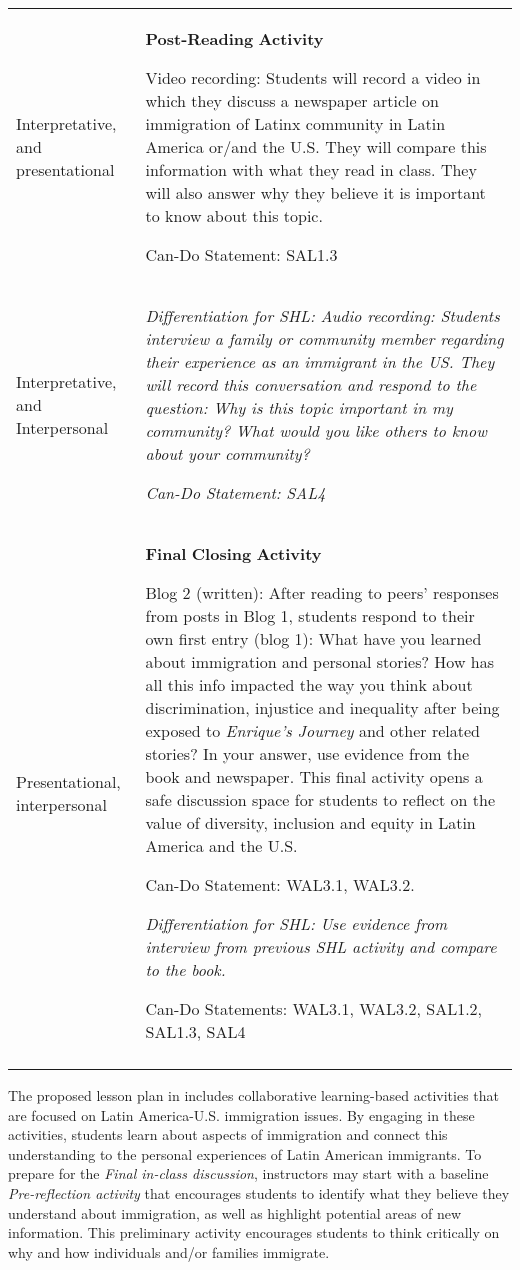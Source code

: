 \documentclass[output=paper]{langscibook}
\begin{document}
\begin{table}%
\footnotesize
\begin{tabularx}{\textwidth}{p{2cm}Q}
\midrule
\raggedright
Interpretative,
and presentational & \textbf{Post-Reading} \textbf{Activity}

Video recording:  Students will record a video in which they discuss a newspaper article on immigration of Latinx community in Latin America or/and the U.S. They will compare this information with what they read in class. They will also answer why they believe it is important to know about this topic.

Can-Do Statement: SAL1.3\\
\raggedright
Interpretative,
and Interpersonal &
\textit{Differentiation for SHL: Audio recording: Students interview a family or community member regarding their experience as an immigrant in the US. They will record this conversation and respond to the question: Why is this topic important in my community? What would you like others to know about your community?}

\textit{Can-Do Statement: SAL4}\\

\midrule
\raggedright
Presentational,
interpersonal  & \textbf{Final} \textbf{Closing} \textbf{Activity}

Blog 2 (written): After reading to peers’ responses from posts in Blog 1, students respond to their own first entry (blog 1): What have you learned about immigration and personal stories? How has all this info impacted the way you think about discrimination, injustice and inequality after being exposed to \textit{Enrique's Journey} and other related stories?  In your answer, use evidence from the book and newspaper. This final activity opens a safe discussion space for students to reflect on the value of diversity, inclusion and equity in Latin America and the U.S.

Can-Do Statement: WAL3.1, WAL3.2.

\textit{Differentiation for SHL: Use evidence from interview from previous SHL activity and compare to the book.}

Can-Do Statements: WAL3.1, WAL3.2, SAL1.2, SAL1.3, SAL4\\
\lspbottomrule
\end{tabularx}
\end{table}


The proposed lesson plan in  includes collaborative learning-based activities that are focused on Latin America-U.S. immigration issues. By engaging in these activities, students learn about aspects of immigration and connect this understanding to the personal experiences of Latin American immigrants. To prepare for the \textit{Final in-class discussion}, instructors may start with a baseline \textit{Pre-reflection activity} that encourages students to identify what they believe they understand about immigration, as well as highlight potential areas of new information. This preliminary activity encourages students to think critically on why and how individuals and/or families immigrate.\largerpage
\end{document}
